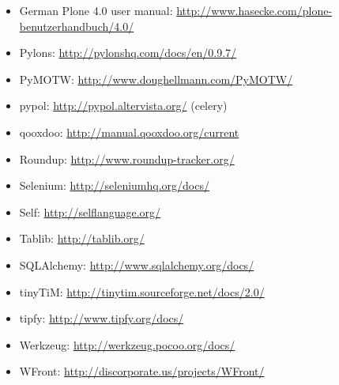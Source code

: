 \documentclass[letterpaper,10pt,english]{sphinxmanual}
\begin{document}
\begin{itemize}
\item {} 
German Plone 4.0 user manual:
\url{http://www.hasecke.com/plone-benutzerhandbuch/4.0/}

\item {} 
Pylons: \url{http://pylonshq.com/docs/en/0.9.7/}

\item {} 
PyMOTW: \url{http://www.doughellmann.com/PyMOTW/}

\item {} 
pypol: \url{http://pypol.altervista.org/} (celery)

\item {} 
qooxdoo: \url{http://manual.qooxdoo.org/current}

\item {} 
Roundup: \url{http://www.roundup-tracker.org/}

\item {} 
Selenium: \url{http://seleniumhq.org/docs/}

\item {} 
Self: \url{http://selflanguage.org/}

\item {} 
Tablib: \url{http://tablib.org/}

\item {} 
SQLAlchemy: \url{http://www.sqlalchemy.org/docs/}

\item {} 
tinyTiM: \url{http://tinytim.sourceforge.net/docs/2.0/}

\item {} 
tipfy: \url{http://www.tipfy.org/docs/}

\item {} 
Werkzeug: \url{http://werkzeug.pocoo.org/docs/}

\item {} 
WFront: \url{http://discorporate.us/projects/WFront/}

\end{itemize}
\end{document}

